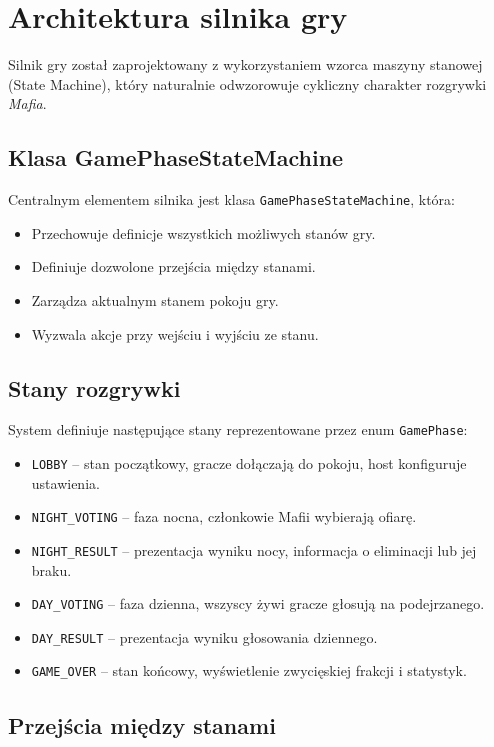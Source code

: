﻿\documentclass[a4paper,twoside,11pt]{mwrep}
\theoremstyle{plain} \newtheorem{thm}{Twierdzenie}
\theoremstyle{plain} \newtheorem{lem}{Lemat}
\theoremstyle{definition} \newtheorem{defn}{Definicja}
\theoremstyle{remark} \newtheorem*{rem}{Wniosek}
\begin{document}
\section{Architektura silnika gry}

Silnik gry został zaprojektowany z wykorzystaniem wzorca maszyny stanowej (State Machine), który naturalnie odwzorowuje cykliczny charakter rozgrywki \textit{Mafia}.

\subsection{Klasa GamePhaseStateMachine}

Centralnym elementem silnika jest klasa \texttt{GamePhaseStateMachine}, która:
\begin{itemize}
    \item Przechowuje definicje wszystkich możliwych stanów gry.
    \item Definiuje dozwolone przejścia między stanami.
    \item Zarządza aktualnym stanem pokoju gry.
    \item Wyzwala akcje przy wejściu i wyjściu ze stanu.
\end{itemize}

\subsection{Stany rozgrywki}

System definiuje następujące stany reprezentowane przez enum \texttt{GamePhase}:

\begin{itemize}
    \item \texttt{LOBBY} -- stan początkowy, gracze dołączają do pokoju, host konfiguruje ustawienia.
    \item \texttt{NIGHT\_VOTING} -- faza nocna, członkowie Mafii wybierają ofiarę.
    \item \texttt{NIGHT\_RESULT} -- prezentacja wyniku nocy, informacja o eliminacji lub jej braku.
    \item \texttt{DAY\_VOTING} -- faza dzienna, wszyscy żywi gracze głosują na podejrzanego.
    \item \texttt{DAY\_RESULT} -- prezentacja wyniku głosowania dziennego.
    \item \texttt{GAME\_OVER} -- stan końcowy, wyświetlenie zwycięskiej frakcji i statystyk.
\end{itemize}

\subsection{Przejścia między stanami}
\end{document}
